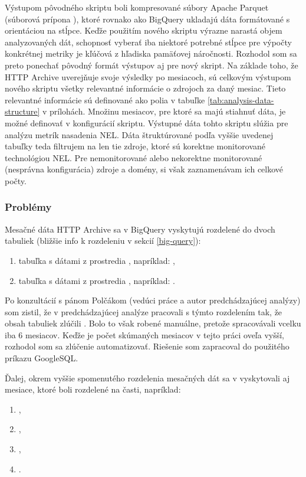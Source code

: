 Výstupom pôvodného skriptu boli kompresované súbory Apache Parquet (súborová prípona ), ktoré rovnako ako BigQuery ukladajú dáta formátované s orientáciou na stĺpce.
Keďže použitím nového skriptu výrazne narastá objem analyzovaných dát, schopnosť vyberať iba niektoré potrebné stĺpce pre výpočty konkrétnej metriky je kľúčová z hľadiska pamäťovej náročnosti.
Rozhodol som sa preto ponechať pôvodný formát výstupov aj pre nový skript. 
Na základe toho, že HTTP Archive uverejňuje svoje výsledky po mesiacoch, sú celkovým výstupom 
nového skriptu všetky relevantné informácie o zdrojoch za daný mesiac.
Tieto relevantné informácie sú definované ako polia v tabuľke \ref{tab:analysis-data-structure} v prílohách.
Množinu mesiacov, pre ktoré sa majú stiahnuť dáta, je možné definovať v konfigurácií skriptu.
Výstupné dáta tohto skriptu slúžia pre analýzu metrík nasadenia NEL.
Dáta štruktúrované podľa vyššie uvedenej tabuľky teda filtrujem na len tie zdroje, ktoré sú korektne monitorované technológiou NEL.
Pre nemonitorované alebo nekorektne monitorované (nesprávna konfigurácia) zdroje a domény, si však zaznamenávam ich celkové počty.

\subsubsection{Problémy}

Mesačné dáta HTTP Archive sa v BigQuery vyskytujú rozdelené do dvoch tabuliek (bližšie info k rozdeleniu v sekcií \ref{big-query}):
\begin{enumerate}
    \item tabuľka s dátami z prostredia , napríklad: ,
    \item tabuľka s dátami z prostredia , napríklad: .
\end{enumerate}

Po konzultácií s pánom Polčákom (vedúci práce a autor predchádzajúcej analýzy) som zistil, že v predchádzajúcej analýze pracovali s týmto rozdelením tak, že obsah tabuliek zlúčili \cite{nel-http-archive}.
Bolo to však robené manuálne, pretože spracovávali vcelku iba 6 mesiacov.
Keďže je počet skúmaných mesiacov v tejto práci oveľa vyšší, rozhodol som sa zlúčenie automatizovať.
Riešenie som zapracoval do použitého príkazu GoogleSQL.

Ďalej, okrem vyššie spomenutého rozdelenia mesačných dát sa v vyskytovali aj mesiace, ktoré boli rozdelené na časti, napríklad:
\begin{enumerate}
    \item {},
    \item {},
    \item {},
    \item {}.
\end{enumerate}

